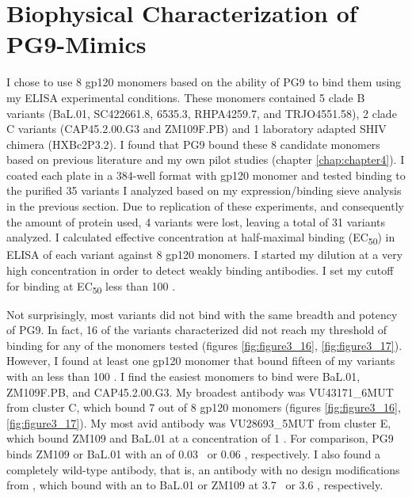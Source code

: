 \section{Biophysical Characterization of PG9-Mimics}
I chose to use 8 gp120 monomers based on the ability of PG9 to bind them using my ELISA experimental conditions. These monomers contained 5 clade B variants (BaL.01, SC422661.8, 6535.3, RHPA4259.7, and TRJO4551.58), 2 clade C variants (CAP45.2.00.G3 and ZM109F.PB) and 1 laboratory adapted SHIV chimera (HXBc2P3.2). I found that PG9 bound these 8 candidate monomers based on previous literature \citep{McLellan:2011dg} and my own pilot studies (chapter \ref{chap:chapter4}). I coated each plate in a 384-well format with gp120 monomer and tested binding to the purified 35 variants I analyzed based on my expression/binding sieve analysis in the previous section. Due to replication of these experiments, and consequently the amount of protein used, 4 variants were lost, leaving a total of 31 variants analyzed. I calculated effective concentration at half-maximal binding (EC\textsubscript{50}) in ELISA of each variant against 8 gp120 monomers. I started my dilution at a very high concentration in order to detect weakly binding antibodies. I set my cutoff for binding at EC\textsubscript{50} less than 100 \mcml.

Not surprisingly, most variants did not bind with the same breadth and potency of PG9. In fact, 16 of the variants characterized did not reach my threshold of binding for any of the monomers tested (figures \ref{fig:figure3_16}, \ref{fig:figure3_17}). However, I found at least one gp120 monomer that bound fifteen of my variants with an \ec less than 100 \mcml. I find the easiest monomers to bind were BaL.01, ZM109F.PB, and CAP45.2.00.G3. My broadest antibody was VU43171\_6MUT from cluster C, which bound 7 out of 8 gp120   monomers (figures \ref{fig:figure3_16}, \ref{fig:figure3_17}). My most avid antibody was VU28693\_5MUT from cluster E, which bound ZM109 and BaL.01 at a concentration of 1 \mcml. For comparison, PG9 binds ZM109 or BaL.01 with an \ec of 0.03 \mcml~or 0.06 \mcml, respectively. I also found a completely wild-type antibody, that is, an antibody with no design modifications from \rosetta, which bound with an \ec to BaL.01 or ZM109 at 3.7 \mcml~or 3.6 \mcml, respectively.


